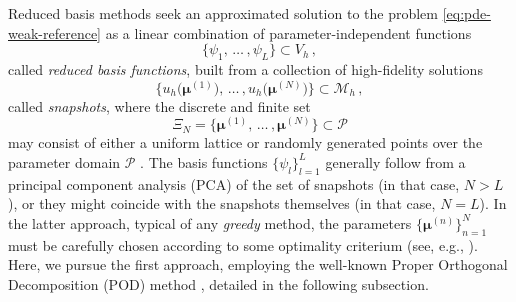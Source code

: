 \documentclass{elsarticle}
\theoremstyle{theorem}
\theoremstyle{definition}
\theoremstyle{remark}
\theoremstyle{proposition}
\numberwithin{figure}{section}
\newcommand{\bg}[1]{\boldsymbol{#1}}
\begin{document}
		\iffalse
		To derive a standard projection-based reduced basis method, we introduce the notion of \emph{solution manifold} $\mathcal{M}$, defined as
		\begin{equation*}
			\mathcal{M} = \big\lbrace u(\bg{\mu}) ~ : ~ \bg{\mu} \in \mathcal{P} \big\rbrace \subset V \, .
		\end{equation*}
		Similarly, its discrete counterpart $\mathcal{M}_h$ is given by
		\begin{equation*}
			\mathcal{M}_h = \big\lbrace u_h(\bg{\mu}) ~ : ~ \bg{\mu} \in \mathcal{P} \big\rbrace \subset V_h \, .
		\end{equation*}
		For any $\bg{\mu} \in \mathcal{P}$, we assume that the FE solution $u_h(\bg{\mu})$ can be lead as close as desired (in the $V$-norm) to the corresponding continuous solution $u_h(\bg{\mu})$ (either by refining the computational mesh or by increasing the order of the FE space), so that $\mathcal{M}_h$ provides a good approximation of $\mathcal{M}$. Hence, in the following we refer to $u_h(\bg{\mu})$ as the \emph{truth} solution.
		\fi
		
		Reduced basis methods seek an approximated solution to the problem \eqref{eq:pde-weak-reference} as a linear combination of parameter-independent functions \[ \big\lbrace \psi_1, \, \ldots \, , \psi_L \big\rbrace \subset V_h \, , \] called \emph{reduced basis functions}, built from a collection of high-fidelity solutions \[ \big\lbrace u_h \big( \bg{\mu}^{(1)} \big), \, \ldots \, , u_h \big( \bg{\mu}^{(N)} \big) \big\rbrace \subset \mathcal{M}_h \, , \] called \emph{snapshots}, where the discrete and finite set \[ \Xi_N = \big\lbrace \bg{\mu}^{(1)}, \, \ldots \, , \bg{\mu}^{(N)} \big\rbrace \subset \mathcal{P} \] may consist of either a uniform lattice or randomly generated points over the parameter domain $\mathcal{P}$ \cite{HSR16}. The basis functions $\big\lbrace \psi_l \big\rbrace_{l = 1}^L$ generally follow from a principal component analysis (PCA) of the set of snapshots (in that case, $N > L$), or they might coincide with the snapshots themselves (in that case, $N = L$). In the latter approach, typical of any \emph{greedy} method, the parameters $\big\lbrace \bg{\mu}^{(n)} \big\rbrace_{n = 1}^N$ must be carefully chosen according to some optimality criterium (see, e.g., \cite{Chen17}). Here, we pursue the first approach, employing the well-known Proper Orthogonal Decomposition (POD) method \cite{Vol08}, detailed in the following subsection.
		
\end{document}
